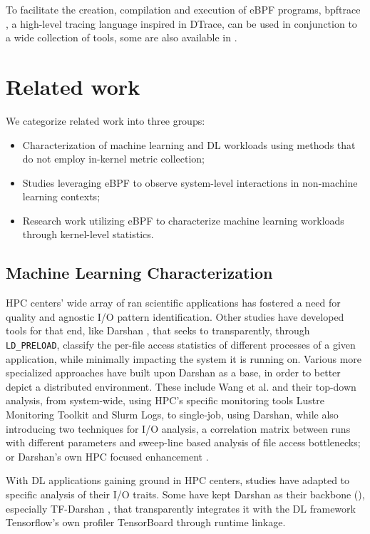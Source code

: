 \documentclass[conference]{IEEEtran}
\begin{document}
To facilitate the creation, compilation and execution of eBPF programs, bpftrace \cite{bpftrace}, a high-level tracing language inspired in DTrace, can be used in conjunction to a wide collection of tools, some are also available in \cite{bgreggBook}.

\section{Related work}

We categorize related work into three groups:
\begin{itemize}
	\item Characterization of machine learning and DL workloads using methods that do not employ in-kernel metric collection;
	\item Studies leveraging eBPF to observe system-level interactions in non-machine learning contexts;
	\item Research work utilizing eBPF to characterize machine learning workloads through kernel-level statistics.
\end{itemize}

\subsection{Machine Learning Characterization}

HPC centers' wide array of ran scientific applications has fostered a need for quality and agnostic I/O pattern identification. Other studies have developed tools for that end, like Darshan \cite{HPCIO24/7}, that seeks to transparently, through \texttt{LD\_PRELOAD}, classify the per-file access statistics of different processes of a given application, while minimally impacting the system it is running on. Various more specialized approaches have built upon Darshan as a base, in order to better depict a distributed environment. These include Wang et al. \cite{zoomin} and their top-down analysis, from system-wide, using HPC's specific monitoring tools Lustre Monitoring Toolkit and Slurm Logs, to single-job, using Darshan, while also introducing two techniques for I/O analysis, a correlation matrix between runs with different parameters and sweep-line based analysis of file access bottlenecks; or Darshan's own HPC focused enhancement \cite{HPCIODarshan}.

With DL applications gaining ground in HPC centers, studies have adapted to specific analysis of their I/O traits. Some have kept Darshan as their backbone (\cite{IOHPCDLBOOK,CharacterizationMLIOLeadHPC,DFTracerAIHPC,UnderstandingDLIOHPC}), especially TF-Darshan \cite{tfdarshan}, that transparently integrates it with the DL framework Tensorflow's own profiler TensorBoard through runtime linkage. 
\end{document}
